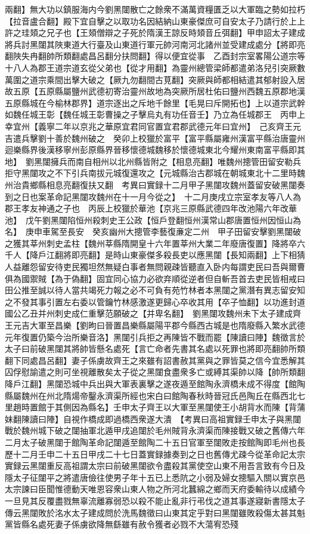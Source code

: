 兩翻】無大功以鎮服海内今劉黑闥散亡之餘衆不滿萬資糧匱乏以大軍臨之勢如拉朽【拉音盧合翻】殿下宜自擊之以取功名因結納山東豪傑庶可自安太子乃請行於上上許之珪頍之兄子也【王頍僧辯之子死於隋漢王諒反時頍音丘弭翻】甲申詔太子建成將兵討黑闥其陜東道大行臺及山東道行軍元帥河南河北諸州並受建成處分【將即亮翻陜失冉翻帥所類翻處昌呂翻分扶問翻】得以便宜從事　乙酉封宗室畧陽公道宗等十八人為郡王道宗道玄從父弟也【從才用翻】為靈州總管梁師都遣弟洛兒引突厥數萬圍之道宗乘間出擊大破之【厥九勿翻間古莧翻】突厥與師都相結遣其郁射設入居故五原【五原縣屬鹽州武德初寄治靈州故地為突厥所居杜佑曰鹽州西魏五原郡地漢五原縣城在今榆林郡界】道宗逐出之斥地千餘里【毛晃曰斥開拓也】上以道宗武幹如魏任城王彰【魏任城王彰曹操之子擊烏丸有功任音壬】乃立為任城郡王　丙申上幸宜州【義寧二年以京兆之華原宜君同官置宜君郡武德元年曰宜州】　己亥齊王元吉遣兵擊劉十善於魏州破之　癸卯上校獵於富平【富平縣屬雍州漢富平縣治唐靈州迴樂縣界後漢移寧州彭原縣界晉移懷德城魏移於懷德城東北今耀州東南富平縣即其地】　劉黑闥擁兵而南自相州以北州縣皆附之【相息亮翻】唯魏州摠管田留安勒兵拒守黑闥攻之不下引兵南拔元城復還攻之【元城縣治古郡城在朝城東北十二里時魏州治貴鄉縣相息亮翻復扶又翻　考異曰實録十二月甲子黑闥攻魏州蓋留安破黑闥奏到之日也案革命記黑闥攻魏州在十一月今從之】　十二月庚戌立宗室孝友等八人為郡王孝友神通之子也　丙辰上校獵於華池【京兆三原縣武德四年改池陽六年改華池】　戊午劉黑闥陷恒州殺刺史王公政【恒戶登翻恒州漢常山郡唐置恒州因恒山為名】　庚申車駕至長安　癸亥幽州大摠管李藝復亷定二州　甲子田留安擊劉黑闥破之獲其莘州刺史孟柱【魏州莘縣隋開皇十六年置莘州大業二年廢唐復置】降將卒六千人【降戶江翻將即亮翻】是時山東豪傑多殺長吏以應黑闥【長知兩翻】上下相猜人益離怨留安待吏民獨坦然無疑白事者無問親疎皆聽直入卧内每謂吏民曰吾與爾曹俱為國禦賊【為于偽翻】固宜同心協力必欲弃順從逆者但自斬吾首去吏民皆相戒曰田公推至誠以待人當共竭死力報之必不可負有苑竹林者本黑闥之黨潛有異志留安知之不發其事引置左右委以管鑰竹林感激遂更歸心卒收其用【卒子恤翻】以功進封道國公乙丑并州刺史成仁重擊范願破之【并卑名翻】　劉黑闥攻魏州未下太子建成齊王元吉大軍至昌樂【劉昫曰晉置昌樂縣屬陽平郡今縣西古城是也隋廢縣入繁水武德元年復置仍築今治所樂音洛】黑闥引兵拒之再陳皆不戰而罷【陳讀曰陣】魏徵言於太子曰前破黑闥其將帥皆懸名處死【言亡命者先書其名處以死罪也將即亮翻帥所類翻下同處昌呂翻】妻子係虜故齊王之來雖有詔書赦其黨與之罪皆莫之信今宜悉解其囚俘慰諭遣之則可坐視離散矣太子從之黑闥食盡衆多亡或縛其渠帥以降【帥所類翻降戶江翻】黑闥恐城中兵出與大軍表裏擊之遂夜遁至館陶永濟橋未成不得度【館陶縣屬魏州在州北隋煬帝鑿永濟渠所經也宋白曰館陶春秋時晉冠氏邑陶丘在縣西北七里趙時置館于其側因為縣名】壬申太子齊王以大軍至黑闥使王小胡背水而陳【背蒲妹翻陳讀曰陣】自視作橋成即過橋西衆遂大潰　【考異曰高祖實録壬申太子與黑闥戰於魏州城下破之闥抽軍北遁甲戌追闥於毛州賊背永濟渠而陳接戰又破之舊傳六年二月太子破黑闥于館陶革命記闥遁至館陶二十五日官軍至闥敗走按館陶即毛州也長歷十二月壬申二十五日甲戌二十七日蓋實録據奏到之日也舊傳尤疎今從革命記太宗實録云黑闥重反高祖謂太宗曰前破黑闥欲令盡殺其黨使空山東不用吾言致有今日及隱太子征闥平之將遣唐儉往使男子年十五已上悉阬之小弱及婦女摠驅入關以實京邑太宗諫曰臣聞惟德動天唯恩容衆山東人物之所河北蠶綿之鄉而天府委輸待以成績今一旦見其反覆盡戮無辜流離寡弱恐以殺不能止亂非行弔伐之道其事遂寢新書隱太子傳云黑闥敗於洺水太子建成問於洗馬魏徵曰山東其定乎對曰黑闥雖敗殺傷太甚其魁黨皆縣名處死妻子係虜欲降無繇雖有赦令獲者必戮不大蕩宥恐殘